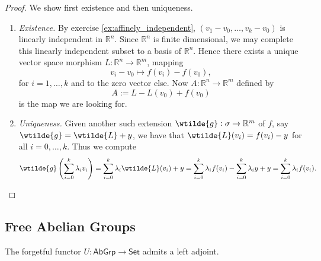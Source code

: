 \begin{proof}
	We show first existence and then uniqueness.
	\begin{enumerate}[label = \textit{Step \arabic*:},wide=0pt]
		\item \textit{Existence.} By exercise \ref{ex:affinely_independent}, $(v_1 - v_0,\dots, v_k - v_0)$ is linearly independent in $\mathbb{R}^n$. Since $\mathbb{R}^n$ is finite dimensional, we may complete this linearly independent subset to a basis of $\mathbb{R}^n$. Hence there exists a unique vector space morphism $L : \mathbb{R}^n \to \mathbb{R}^m$, mapping 
			\begin{equation*}
				v_i - v_0 \mapsto f(v_i) - f(v_0),
			\end{equation*}
			\noindent for $i = 1,\dots,k$ and to the zero vector else. Now $A : \mathbb{R}^n \to \mathbb{R}^m$ defined by
			\begin{equation*}
				 A := L - L(v_0) + f(v_0)
			\end{equation*}
			\noindent is the map we are looking for.
		\item \textit{Uniqueness.} Given another such extension $\wtilde{g} : \sigma \to \mathbb{R}^m$ of $f$, say $\wtilde{g} = \wtilde{L} + y$, we have that $\wtilde{L}(v_i) = f(v_i) - y$ for all $i = 0,\dots,k$. Thus we compute 
			\begin{equation*}
				\wtilde{g}\del[4]{\sum_{i = 0}^k \lambda_i v_i} = \sum_{i = 0}^k \lambda_i \wtilde{L}(v_i) + y = \sum_{i = 0}^k \lambda_i f(v_i) - \sum_{i = 0}^k \lambda_i y + y = \sum_{i = 0}^k \lambda_i f(v_i).
			\end{equation*}
	\end{enumerate}
\end{proof}


\subsection*{Free Abelian Groups}

\begin{proposition}
	\label{prop:F_set_abgrp}
	The forgetful functor $U : \mathsf{AbGrp} \to \mathsf{Set}$ admits a left adjoint.	
\end{proposition}


